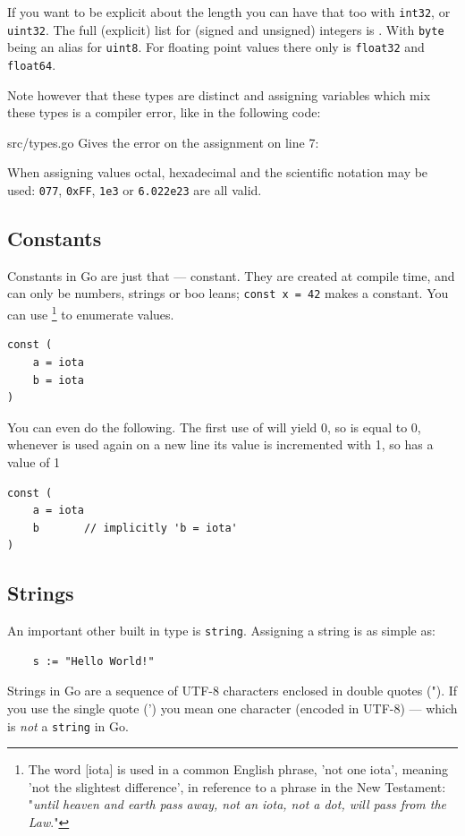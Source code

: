 If you want to be explicit about the length you can have
that too with \lstinline{int32}, or \lstinline{uint32}. The full
(explicit) list for (signed and unsigned) integers is
.
With \lstinline{byte} being an
alias for \lstinline{uint8}. For floating point values there only is
\lstinline{float32} and \lstinline{float64}.

Note however
that these types are distinct and assigning variables which mix
these types is a compiler error, like in the following code:


{src/types.go}
Gives the error on the assignment on line 7:

\noindent{}
When assigning values octal, hexadecimal and the scientific notation may be used: 
\lstinline{077}, \lstinline{0xFF}, \lstinline{1e3} or
\lstinline{6.022e23} are all valid.

\subsection{Constants}
Constants in Go are just that --- constant. They are created at compile
time, and can only be numbers, strings or boo leans;
\lstinline{const x = 42} makes  a constant. You can use
 \footnote{The word [iota] is used in a common English phrase,
'not one iota', meaning 'not the slightest difference', in reference to
a phrase in the New Testament: "\emph{until heaven and earth pass away, not an
iota, not a dot, will pass from the Law}."\cite{iota}}
to enumerate values.
\begin{lstlisting}
const (
	a = iota
	b = iota 
)
\end{lstlisting}
You can even do the following. The first use of  will yield 0, so  is equal to 0, whenever
 is used again on a new line its value is incremented with 1, so 
has a value of 1
\begin{lstlisting}
const (
	a = iota
	b	    // implicitly 'b = iota'
)
\end{lstlisting}

\subsection{Strings}
An important other built in type is \lstinline{string}. Assigning a
string is as simple as:
\begin{lstlisting}
    s := "Hello World!"
\end{lstlisting}
Strings in Go are a sequence of UTF-8 characters enclosed in double
quotes ("). If you use the single quote (') you mean one character
(encoded in UTF-8) --- which is \emph{not} a \lstinline{string} in Go.

